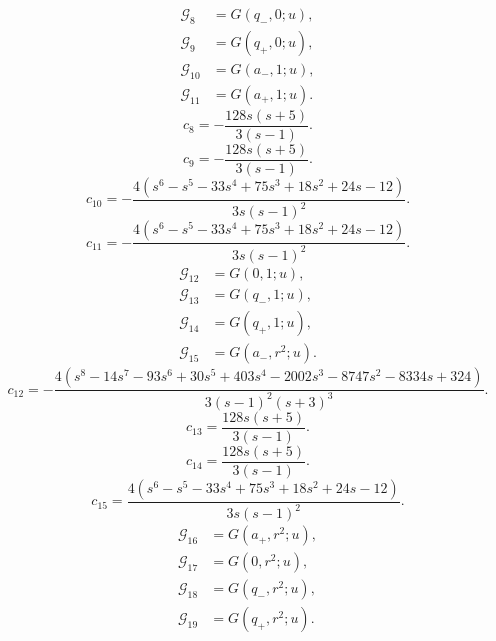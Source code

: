 \begin{align}
\mathcal G_{8}&=G(q_{-},0;u),\\
\mathcal G_{9}&=G(q_{+},0;u),\\
\mathcal G_{10}&=G(a_{-},1;u),\\
\mathcal G_{11}&=G(a_{+},1;u).
\end{align}
\begin{equation}
c_{8}=- \frac{128 s \left(s + 5\right)}{3 \left(s - 1\right)}.
\end{equation}
\begin{equation}
c_{9}=- \frac{128 s \left(s + 5\right)}{3 \left(s - 1\right)}.
\end{equation}
\begin{equation}
c_{10}=- \frac{4 \left(s^{6} - s^{5} - 33 s^{4} + 75 s^{3} + 18 s^{2} + 24 s - 12\right)}{3 s \left(s - 1\right)^{2}}.
\end{equation}
\begin{equation}
c_{11}=- \frac{4 \left(s^{6} - s^{5} - 33 s^{4} + 75 s^{3} + 18 s^{2} + 24 s - 12\right)}{3 s \left(s - 1\right)^{2}}.
\end{equation}
\begin{align}
\mathcal G_{12}&=G(0,1;u),\\
\mathcal G_{13}&=G(q_{-},1;u),\\
\mathcal G_{14}&=G(q_{+},1;u),\\
\mathcal G_{15}&=G(a_{-},r^{2};u).
\end{align}
\begin{equation}
c_{12}=- \frac{4 \left(s^{8} - 14 s^{7} - 93 s^{6} + 30 s^{5} + 403 s^{4} - 2002 s^{3} - 8747 s^{2} - 8334 s + 324\right)}{3 \left(s - 1\right)^{2} \left(s + 3\right)^{3}}.
\end{equation}
\begin{equation}
c_{13}=\frac{128 s \left(s + 5\right)}{3 \left(s - 1\right)}.
\end{equation}
\begin{equation}
c_{14}=\frac{128 s \left(s + 5\right)}{3 \left(s - 1\right)}.
\end{equation}
\begin{equation}
c_{15}=\frac{4 \left(s^{6} - s^{5} - 33 s^{4} + 75 s^{3} + 18 s^{2} + 24 s - 12\right)}{3 s \left(s - 1\right)^{2}}.
\end{equation}
\begin{align}
\mathcal G_{16}&=G(a_{+},r^{2};u),\\
\mathcal G_{17}&=G(0,r^{2};u),\\
\mathcal G_{18}&=G(q_{-},r^{2};u),\\
\mathcal G_{19}&=G(q_{+},r^{2};u).
\end{align}
